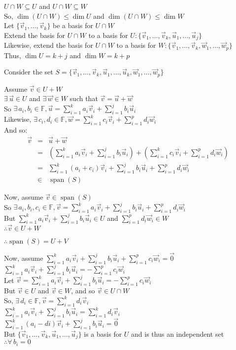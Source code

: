 \documentclass[letterpaper,12pt,fleqn]{article}
\DeclareMathOperator{\spn}{span}
\newcommand{\vu}{\vec{u}}
\newcommand{\vv}{\vec{v}}
\newcommand{\vw}{\vec{w}}
\newcommand{\vz}{\vec{0}}
\newcommand{\F}{\mathbb{F}}
\begin{document}
\begin{theproof}
  $U\cap W\subseteq U$ and $U\cap W\subseteq W$ \\
  So, $\dim(U\cap W)\le\dim U$ and $\dim(U\cap W)\le\dim W$ \\
  Let $\{\vv_1,\ldots,\vv_k\}$ be a basis for $U\cap W$ \\
  Extend the basis for $U\cap W$ to a basis for
  $U: \{\vv_1,\ldots,\vv_k,\vu_1,\ldots,\vu_j\}$ \\
  Likewise, extend the basis for $U\cap W$ to a basis for
  $W: \{\vv_1,\ldots,\vv_k,\vw_1,\ldots,\vw_p\}$ \\
  Thus, $\dim U=k+j$ and $\dim W=k+p$
  
  Consider the set $S=\{\vv_1,\ldots,\vv_k,\vu_1,\ldots,\vu_k,\vw_1,\ldots,\vw_p\}$

  Assume $\vv\in U+W$ \\
  $\exists\,\vu\in U$ and $\exists\,\vw\in W$ such that $\vv=\vu+\vw$ \\
  So $\exists\,a_i,b_i\in\F,\vu=\sum_{i=1}^ka_i\vv_i+\sum_{i=1}^jb_i\vu_i$ \\
  Likewise, $\exists\,c_i,d_i\in\F,\vw=\sum_{i=1}^kc_i\vv_i+\sum_{i=1}^pd_i\vw_i$ \\
  And so:
  \begin{eqnarray*}
    \vv &=& \vu+\vw \\
    &=& \left(\sum_{i=1}^ka_i\vv_i+\sum_{i=1}^jb_i\vu_i\right)+
    \left(\sum_{i=1}^kc_i\vv_i+\sum_{i=1}^pd_i\vw_i\right) \\
    &=& \sum_{i=1}^k(a_i+c_i)\vv_i+\sum_{i=1}^jb_i\vu_i+\sum_{i=1}^pd_i\vw_i \\
    &\in& \spn(S)
  \end{eqnarray*}

  Now, assume $\vv\in\spn(S)$ \\
  So $\exists\,a_i,b_i,c_i\in\F,\vv=\sum_{i=1}^ka_i\vv_i+\sum_{i=1}^jb_i\vu_i+
  \sum_{i=1}^pd_i\vw_i$ \\
  But $\sum_{i=1}^ka_i\vv_i+\sum_{i=1}^jb_i\vu_i\in U$ and
  $\sum_{i=1}^pd_i\vw_i\in W$ \\
  $\therefore \vv\in U+W$

  $\therefore \spn(S)=U+V$

  Now, assume $\sum_{i=1}^ka_i\vv_i+\sum_{i=1}^jb_i\vu_i+\sum_{i=1}^pc_i\vw_i=\vz$ \\
  $\sum_{i=1}^ka_i\vv_i+\sum_{i=1}^jb_i\vu_i=-\sum_{i=1}^pc_i\vw_i$ \\
  Let $\vv=\sum_{i=1}^ka_i\vv_i+\sum_{i=1}^jb_i\vu_i=-\sum_{i=1}^pc_i\vw_i$ \\
  But $\vv\in U$ and $\vv\in W$, and so $\vv\in U\cap W$ \\
  So, $\exists\,d_i\in\F,\vv=\sum_{i=1}^kd_i\vv_i$ \\
  $\sum_{i=1}^ka_i\vv_i+\sum_{i=1}^jb_i\vu_i=\sum_{i=1}^kd_i\vv_i$ \\
  $\sum_{i=1}^k(a_i-di)\vv_i+\sum_{i=1}^jb_i\vu_i=\vz$ \\
  But $\{\vv_1,\ldots,\vv_k,\vu_1,\ldots,\vu_j\}$ is a basis for $U$ and is thus an
  independent set \\
  $\therefore\forall\,b_i=0$


\end{theproof}
\end{document}
